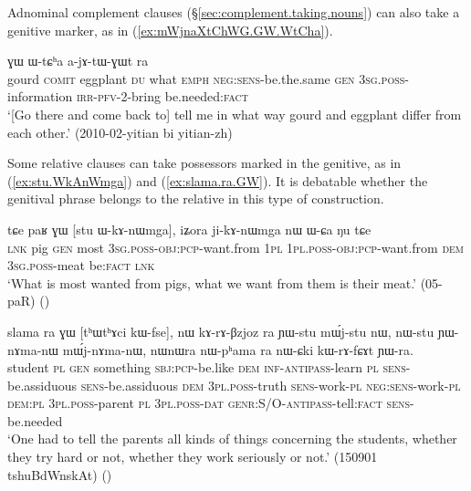 Adnominal complement clauses (§\ref{sec:complement.taking.nouns}) can also take a genitive marker, as in (\ref{ex:mWjnaXtChWG.GW.WtCha}).

\begin{exe}
\ex \label{ex:mWjnaXtChWG.GW.WtCha}
 ɣɯ ɯ-tɕʰa a-jɤ-tɯ-ɣɯt ra \\
gourd \textsc{comit} eggplant \textsc{du} what \textsc{emph} \textsc{neg}:\textsc{sens}-be.the.same \textsc{gen} \textsc{3sg}.\textsc{poss}-information \textsc{irr}-\textsc{pfv}-2-bring be.needed:\textsc{fact} \\
\glt `[Go there and come back to] tell me in what way gourd and eggplant differ from each other.' (2010-02-yitian bi yitian-zh)
\end{exe}

Some relative clauses can take possessors marked in the genitive, as in  (\ref{ex:stu.WkAnWmga}) and (\ref{ex:slama.ra.GW}). It is debatable whether the genitival phrase belongs to the relative in this type of construction.

\begin{exe}
\ex \label{ex:stu.WkAnWmga}
 \gll tɕe paʁ ɣɯ [stu ɯ-kɤ-nɯmga], iʑora ji-kɤ-nɯmga nɯ ɯ-ɕa ŋu tɕe \\
 \textsc{lnk} pig \textsc{gen} most \textsc{3sg}.\textsc{poss}-\textsc{obj}:\textsc{pcp}-want.from \textsc{1pl} \textsc{1pl}.\textsc{poss}-\textsc{obj}:\textsc{pcp}-want.from \textsc{dem} \textsc{3sg}.\textsc{poss}-meat be:\textsc{fact} \textsc{lnk} \\
\glt  `What is most wanted from pigs, what we want from them is their meat.' (05-paR)
()
\end{exe}

\begin{exe}
\ex \label{ex:slama.ra.GW}
\gll  slama ra ɣɯ [tʰɯtʰɤci kɯ-fse], nɯ kɤ-rɤ-βzjoz ra ɲɯ-stu mɯ́j-stu nɯ, nɯ-stu ɲɯ-nɤma-nɯ mɯ́j-nɤma-nɯ,  nɯnɯra nɯ-pʰama ra nɯ-ɕki kɯ-rɤ-fɕɤt ɲɯ-ra. \\
student \textsc{pl} \textsc{gen} something \textsc{sbj}:\textsc{pcp}-be.like \textsc{dem}  \textsc{inf}-\textsc{antipass}-learn \textsc{pl} \textsc{sens}-be.assiduous \textsc{sens}-be.assiduous \textsc{dem} \textsc{3pl}.\textsc{poss}-truth \textsc{sens}-work-\textsc{pl} \textsc{neg}:\textsc{sens}-work-\textsc{pl} \textsc{dem}:\textsc{pl} \textsc{3pl}.\textsc{poss}-parent \textsc{pl} \textsc{3pl}.\textsc{poss}-\textsc{dat} \textsc{genr}:S/O-\textsc{antipass}-tell:\textsc{fact} \textsc{sens}-be.needed \\
\glt `One had to tell the parents all kinds of things concerning the students, whether they try hard or not, whether they work seriously or not.' (150901 tshuBdWnskAt)
()
\end{exe}

